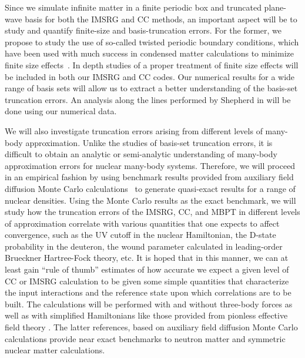 \begin{enumerate}
  Since we simulate infinite matter in a finite periodic box and truncated plane-wave basis for both the
  IMSRG and CC methods, an important aspect will be to study and
  quantify finite-size and basis-truncation errors. For the former, we propose to study the use of
  so-called twisted periodic boundary conditions, which have been used
  with much success in condensed matter calculations to minimize
  finite size effects~\cite{Shepherd:2012,Hagen:2013yba,Drummond:2008}.  In
  depth studies of a proper treatment of finite size effects will be
  included in both our IMSRG and CC codes. Our numerical results for a wide range of basis sets will allow us to extract
  a better understanding of the basis-set truncation errors. An analysis along the lines performed
  by Shepherd in \cite{shepherd2016} will be done using our numerical data.
   
  We will also investigate truncation errors arising from different
  levels of many-body approximation. Unlike the studies of basis-set
  truncation errors, it is difficult to obtain an analytic or
  semi-analytic understanding of many-body approximation errors for
  nuclear many-body systems. Therefore, we will proceed in an
  empirical fashion by using benchmark results provided from auxiliary field diffusion Monte
  Carlo calculations~\cite{Roggero:2013ora,Roggero:2014lga,pederiva2016} to generate quasi-exact 
  results for a range of nuclear densities.  Using the
  Monte Carlo results as the exact benchmark, we will study how the
  truncation errors of the IMSRG, CC, and MBPT in different levels of approximation
  correlate with various quantities that one expects to affect convergence, such as the UV cutoff in the nuclear
  Hamiltonian, the D-state probability in the deuteron, the wound
  parameter calculated in leading-order Brueckner Hartree-Fock theory,
  etc. It is hoped that in this manner, we can at least gain ``rule of
  thumb'' estimates of how accurate we expect a given level of CC or
  IMSRG calculation to be given some simple quantities that
  characterize the input interactions and the reference state upon
  which correlations are to be built.   The calculations will be performed with and without three-body forces as well as with simplified Hamiltonians like those provided from pionless effective field theory \cite{pederiva2016}. The latter references, based on 
auxiliary field diffusion Monte Carlo calculations provide near exact benchmarks to neutron matter and symmetric nuclear matter calculations. 
 \end{enumerate}


